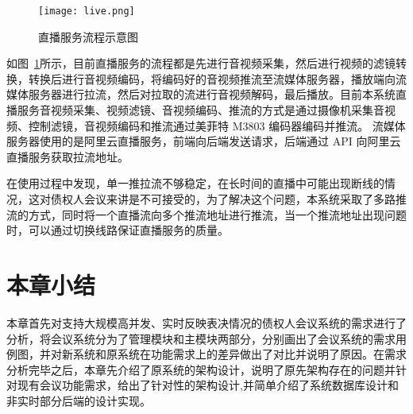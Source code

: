   \begin{figure}[!htp]
    \centering
    \texttt{[image: live.png]}
    \caption{直播服务流程示意图}
    \label{fig:live}
  \end{figure}

  如图~\ref{fig:live}所示，目前直播服务的流程都是先进行音视频采集，然后进行视频的滤镜转换，转换后进行音视频编码，将编码好的音视频推流至流媒体服务器，播放端向流媒体服务器进行拉流，然后对拉取的流进行音视频解码，最后播放。目前本系统直播服务音视频采集、视频滤镜、音视频编码、推流的方式是通过摄像机采集音视频、控制滤镜，音视频编码和推流通过美菲特 M3803 编码器编码并推流。
  流媒体服务器使用的是阿里云直播服务，前端向后端发送请求，后端通过 API 向阿里云直播服务获取拉流地址。

  在使用过程中发现，单一推拉流不够稳定，在长时间的直播中可能出现断线的情况，这对债权人会议来讲是不可接受的，为了解决这个问题，本系统采取了多路推流的方式，同时将一个直播流向多个推流地址进行推流，当一个推流地址出现问题时，可以通过切换线路保证直播服务的质量。

\section{本章小结}
本章首先对支持大规模高并发、实时反映表决情况的债权人会议系统的需求进行了分析，将会议系统分为了管理模块和主模块两部分，分别画出了会议系统的需求用例图，并对新系统和原系统在功能需求上的差异做出了对比并说明了原因。在需求分析完毕之后，本章先介绍了原系统的架构设计，说明了原先架构存在的问题并针对现有会议功能需求，给出了针对性的架构设计,并简单介绍了系统数据库设计和非实时部分后端的设计实现。